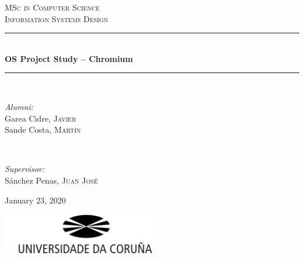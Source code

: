 
\begin{titlepage}
\newcommand{\HRule}{\rule{\linewidth}{0.5mm}}
\center


\textsc{\LARGE MSc in Computer Science }\\[1.5cm]
\textsc{\Large Information Systems Design}\\[0.5cm]


\HRule\\[0.4cm]

{\huge\bfseries OS Project Study -- Chromium}\\[0.4cm]

\HRule\\[1.5cm]


\begin{minipage}{0.4\textwidth}
	\begin{flushleft}
		\large
		\textit{Alumni:}\\
		Garea Cidre, \textsc{Javier}\\
		Sande Costa, \textsc{Martín}
	\end{flushleft}
\end{minipage}
~
\begin{minipage}{0.4\textwidth}
	\begin{flushright}
		\large
		\textit{Supervisor:}\\
		Sánchez Penas, \textsc{Juan José}\\
	\end{flushright}
\end{minipage}


\vfill\vfill\vfill

{\large January 23, 2020}


\vfill\vfill
\includegraphics[width=0.5\textwidth]{img/logoudc.png}\\[1cm]
\vfill
\end{titlepage}
\newpage